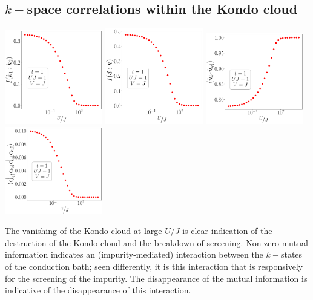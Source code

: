 \documentclass{report}
\numberwithin{equation}{section}
\begin{document}
\subsection*{\(k-\)space correlations within the Kondo cloud}
\begin{center}
	\includegraphics[width=0.32\textwidth]{../figures/corr-k-t=1.000,J=1_over_U,V=J,N=6,U=0.016,91.116,32.pdf}
	\includegraphics[width=0.32\textwidth]{../figures/mi-dk-t=1.000,J=1_over_U,V=J,N=6,U=0.016,91.116,32.pdf}
	\includegraphics[width=0.32\textwidth]{../figures/corr-k-diag-t=1.000,J=1_over_U,V=J,N=6,U=0.016,91.116,32.pdf}
	\includegraphics[width=0.32\textwidth]{../figures/corr-k-od-t=1.000,J=1_over_U,V=J,N=6,U=0.016,91.116,32.pdf}
\end{center}
The vanishing of the Kondo cloud at large \(U/J\) is clear indication of the destruction of the Kondo cloud and the breakdown of screening. Non-zero mutual information indicates an (impurity-mediated) interaction between the \(k-\)states of the conduction bath; seen differently, it is this interaction that is responsively for the screening of the impurity. The disappearance of the mutual information is indicative of the disappearance of this interaction.
\end{document}

